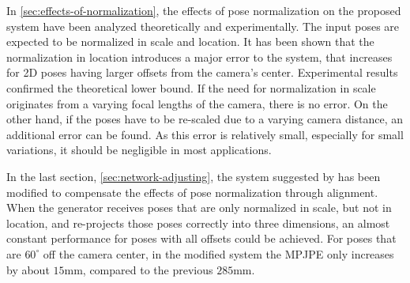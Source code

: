 In \autoref{sec:effects-of-normalization}, the effects of pose normalization on the proposed system have been analyzed theoretically and experimentally.
The input poses are expected to be normalized in scale and location.
It has been shown that the normalization in location introduces a major error to the system, that increases for 2D poses having larger offsets from the camera's center.
Experimental results confirmed the theoretical lower bound.
If the need for normalization in scale originates from a varying focal lengths of the camera, there is no error.
On the other hand, if the poses have to be re-scaled due to a varying camera distance, an additional error can be found.
As this error is relatively small, especially for small variations, it should be negligible in most applications.

In the last section, \autoref{sec:network-adjusting}, the system suggested by \citet{drover18} has been modified to compensate the effects of pose normalization through alignment.
When the generator receives poses that are only normalized in scale, but not in location, and re-projects those poses correctly into three dimensions, an almost constant performance for poses with all offsets could be achieved.
For poses that are $60^{\circ}$ off the camera center, in the modified system the MPJPE only increases by about $15$mm, compared to the previous $285$mm.